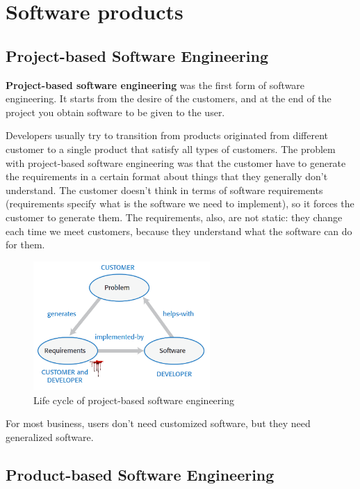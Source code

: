 \chapter{Software products}

\section{Project-based Software Engineering}
\textbf{Project-based software engineering} was the first form of software engineering. It starts from the desire of the customers, and at the end of the project you obtain software to be given to the user.

Developers usually try to transition from products originated from different customer to a single product that satisfy all types of customers. The problem with project-based software engineering was that the customer have to generate the requirements in a certain format about things that they generally don't understand. The customer doesn't think in terms of software requirements (requirements specify what is the software we need to implement), so it forces the customer to generate them. The requirements, also, are not static: they change each time we meet customers, because they understand what the software can do for them.

\begin{figure} [H]
    \centering
    \includegraphics[width=0.6\textwidth]{images/Products/ProductsSE.png}
    \caption{Life cycle of project-based software engineering}
    \label{fig:ProductsSE}
\end{figure} 

\noindent 
For most business, users don't need customized software, but they need generalized software.

\section{Product-based Software Engineering}


